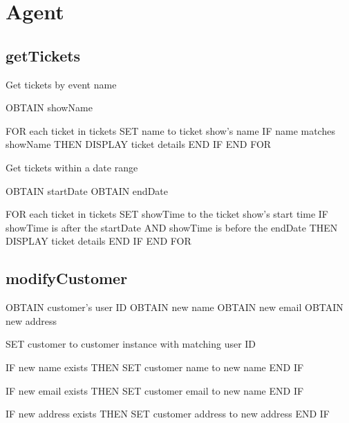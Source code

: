 \section{Agent}

\subsection{getTickets}
Get tickets by event name
\begin{pc}
OBTAIN showName

FOR each ticket in tickets
    SET name to ticket show's name
    IF name matches showName THEN
        DISPLAY ticket details
    END IF
END FOR
\end{pc}

Get tickets within a date range
\begin{pc}
OBTAIN startDate
OBTAIN endDate

FOR each ticket in tickets
    SET showTime to the ticket show's start time
    IF showTime is after the startDate AND showTime is before the endDate THEN
        DISPLAY ticket details
    END IF
END FOR
\end{pc}

\subsection{modifyCustomer}
\begin{pc}
OBTAIN customer's user ID
OBTAIN new name
OBTAIN new email
OBTAIN new address

SET customer to customer instance with matching user ID

IF new name exists THEN
    SET customer name to new name
END IF

IF new email exists THEN
    SET customer email to new name
END IF

IF new address exists THEN
    SET customer address to new address
END IF
\end{pc}
